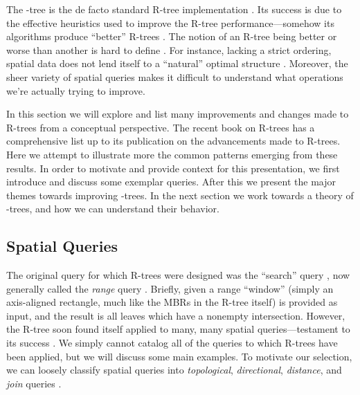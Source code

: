 \newcommand{\keyword}[1]{\textbf{#1}}


The \rstar-tree is the de facto standard R-tree implementation \cite{tocite}.
Its success is due to the effective heuristics used to improve the R-tree performance---somehow its algorithms produce ``better'' R-trees \cite{tocite}.
The notion of an R-tree being better or worse than another is hard to define \cite{tocite}.
For instance, lacking a strict ordering, spatial data does not lend itself to a ``natural'' optimal structure \cite{gaedegunther98}.
Moreover, the sheer variety of spatial queries makes it difficult to understand what operations we're actually trying to improve.

In this section we will explore and list many improvements and changes made to R-trees from a conceptual perspective.
The recent book on R-trees \cite{thebook} has a comprehensive list up to its publication on the advancements made to R-trees.
Here we attempt to illustrate more the common patterns emerging from these results.
In order to motivate and provide context for this presentation, we first introduce and discuss some exemplar queries.
After this we present the major themes towards improving \rbase-trees.
In the next section we work towards a theory of \rbase-trees, and how we can understand their behavior.

\subsection{Spatial Queries}
The original query for which R-trees were designed was the ``search'' query \cite{guttman84}, now generally called the \emph{range} query \cite{tocite}.
Briefly, given a range ``window'' (simply an axis-aligned rectangle, much like the MBRs in the R-tree itself) is provided as input, and the result is all leaves which have a nonempty intersection.
However, the R-tree soon found itself applied to many, many spatial queries---testament to its success \cite{tocite}.
We simply cannot catalog all of the queries to which R-trees have been applied, but we will discuss some main examples.
To motivate our selection, we can loosely classify spatial queries into \emph{topological}, \emph{directional}, \emph{distance}, and \emph{join} queries \cite{thebook,manolopoulos2003r}.

